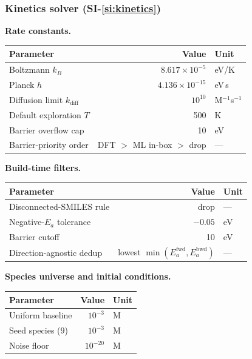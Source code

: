 \subsubsection{Kinetics solver (SI-\ref{si:kinetics})}
\label{sec:params-kin}

\noindent\textbf{Rate constants.}\par\nopagebreak
\noindent\begin{tabular}{p{5cm}rl}
\toprule
Parameter & Value & Unit \\
\midrule
Boltzmann $k_B$ & $8.617 \times 10^{-5}$ & eV/K \\
Planck $h$ & $4.136 \times 10^{-15}$ & eV\,s \\
Diffusion limit $k_\text{diff}$ & $10^{10}$ & M$^{-1}$s$^{-1}$ \\
Default exploration $T$ & 500 & K \\
Barrier overflow cap & 10 & eV \\
Barrier-priority order & DFT $>$ ML in-box $>$ drop & --- \\
\bottomrule
\end{tabular}

\bigskip

\noindent\textbf{Build-time filters.}\par\nopagebreak
\noindent\begin{tabular}{p{5cm}rl}
\toprule
Parameter & Value & Unit \\
\midrule
Disconnected-SMILES rule & drop & --- \\
Negative-$E_a$ tolerance & $-0.05$ & eV \\
Barrier cutoff & 10 & eV \\
Direction-agnostic dedup & lowest $\min(E_a^\text{fwd}, E_a^\text{bwd})$ & --- \\
\bottomrule
\end{tabular}

\bigskip

\noindent\textbf{Species universe and initial conditions.}\par\nopagebreak
\noindent\begin{tabular}{p{5cm}rl}
\toprule
Parameter & Value & Unit \\
\midrule
Uniform baseline & $10^{-3}$ & M \\
Seed species ($9$) & $10^{-3}$ & M \\
Noise floor & $10^{-20}$ & M \\
\bottomrule
\end{tabular}

